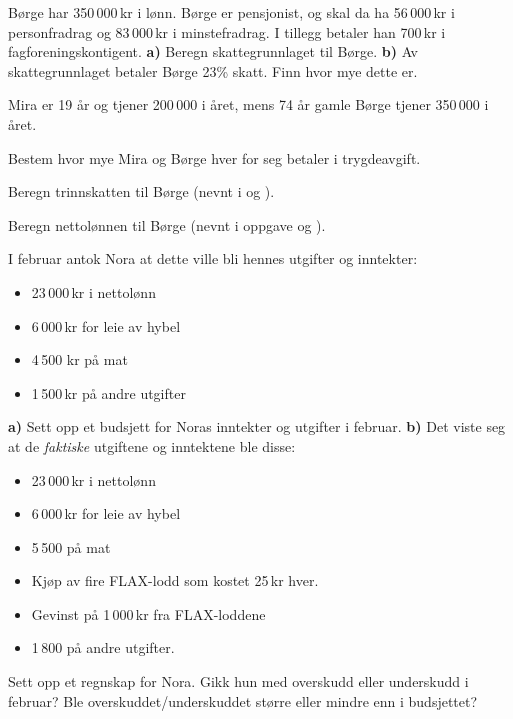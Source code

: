 \nes

Børge har 350\,000\,kr i lønn. Børge er pensjonist, og skal da ha 56\,000\,kr i personfradrag og 83\,000\,kr i minstefradrag. I tillegg betaler han 700\,kr i fagforeningskontigent. \os
\textbf{a)} Beregn skattegrunnlaget til Børge.\os
\textbf{b)} Av skattegrunnlaget betaler Børge 23\% skatt. Finn hvor mye dette er.

Mira er 19 år og tjener 200\,000 i året, mens 74 år gamle Børge tjener 350\,000 i året. \os

Bestem hvor mye Mira og Børge hver for seg betaler i trygdeavgift.

Beregn trinnskatten til Børge (nevnt i  og ).

Beregn nettolønnen til Børge (nevnt i oppgave  og ).

\nes

I februar antok Nora at dette ville bli hennes utgifter og inntekter:
\begin{itemize}
	\item 23\,000\,kr i nettolønn 
	\item 6\,000\,kr for leie av hybel
	\item 4\,500 kr på mat
	\item 1\,500\,kr på andre utgifter
\end{itemize}
\textbf{a)} Sett opp et budsjett for Noras inntekter og utgifter i februar.\os
\textbf{b)} Det viste seg at de \textsl{faktiske} utgiftene og inntektene ble disse:
\begin{itemize}
	\item 23\,000\,kr i nettolønn
	\item 6\,000\,kr for leie av hybel
	\item 5\,500 på mat
	\item Kjøp av fire FLAX-lodd som kostet 25\,kr hver.
	\item Gevinst på 1\,000\,kr fra FLAX-loddene
	\item 1\,800 på andre utgifter.
\end{itemize}
Sett opp et regnskap for Nora. Gikk hun med overskudd eller underskudd i februar? Ble overskuddet/underskuddet større eller mindre enn i budsjettet?



